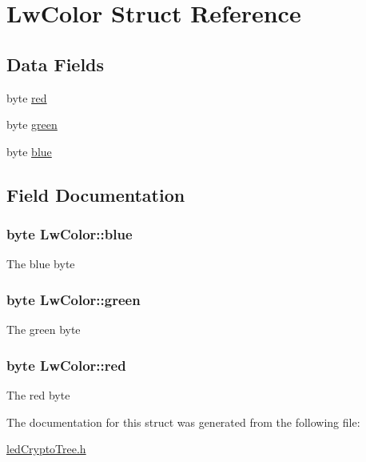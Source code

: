 \hypertarget{structLwColor}{\section{Lw\+Color Struct Reference}
\label{structLwColor}
}
\subsection*{Data Fields}
\begin{DoxyCompactItemize}
\item 
byte \hyperlink{structLwColor_a8493c887c20eb410545f83f2c4fb2ced}{red}
\item 
byte \hyperlink{structLwColor_a4da7ab43afe92d21d7f8fcebbee1ff3d}{green}
\item 
byte \hyperlink{structLwColor_a3f00195781bdbfd0db16c94f8ea85427}{blue}
\end{DoxyCompactItemize}


\subsection{Field Documentation}
\hypertarget{structLwColor_a3f00195781bdbfd0db16c94f8ea85427}{
\subsubsection[{blue}]{\setlength{\rightskip}{0pt plus 5cm}byte Lw\+Color\+::blue}}\label{structLwColor_a3f00195781bdbfd0db16c94f8ea85427}
The blue byte \hypertarget{structLwColor_a4da7ab43afe92d21d7f8fcebbee1ff3d}{
\subsubsection[{green}]{\setlength{\rightskip}{0pt plus 5cm}byte Lw\+Color\+::green}}\label{structLwColor_a4da7ab43afe92d21d7f8fcebbee1ff3d}
The green byte \hypertarget{structLwColor_a8493c887c20eb410545f83f2c4fb2ced}{
\subsubsection[{red}]{\setlength{\rightskip}{0pt plus 5cm}byte Lw\+Color\+::red}}\label{structLwColor_a8493c887c20eb410545f83f2c4fb2ced}
The red byte 

The documentation for this struct was generated from the following file\+:\begin{DoxyCompactItemize}
\item 
\hyperlink{ledCryptoTree_8h}{led\+Crypto\+Tree.\+h}\end{DoxyCompactItemize}
